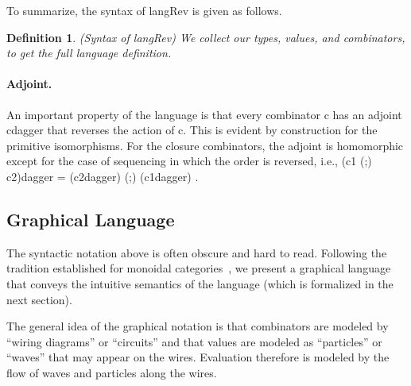 \documentclass[preprint]{sigplanconf}
\newtheorem{definition}[theorem]{Definition}
\begin{document}
To summarize, the syntax of {{langRev}} is given as follows. 

\begin{definition}{(Syntax of {{langRev}})}
\label{def:langRev}
We collect our types, values, and combinators, to get the full language
definition.
%
\end{definition}

\paragraph*{Adjoint.} 
An important property of the language is that every combinator {{c}} has an
adjoint {{c{dagger}}} that reverses the action of {{c}}. This is evident by
construction for the primitive isomorphisms. For the closure combinators, the
adjoint is homomorphic except for the case of sequencing in which the order
is reversed, i.e., {{(c1 (;) c2){dagger} = (c2{dagger}) (;) (c1{dagger}) }}.

\subsection{Graphical Language}

The syntactic notation above is often obscure and hard to read.  Following
the tradition established for monoidal
categories~\cite{springerlink:10.1007/978-3-642-12821-94}, we present a
graphical language that conveys the intuitive semantics of the language
(which is formalized in the next section).

The general idea of the graphical notation is that combinators are modeled by
``wiring diagrams'' or ``circuits'' and that values are modeled as
``particles'' or ``waves'' that may appear on the wires. Evaluation therefore
is modeled by the flow of waves and particles along the wires.

\end{document}
